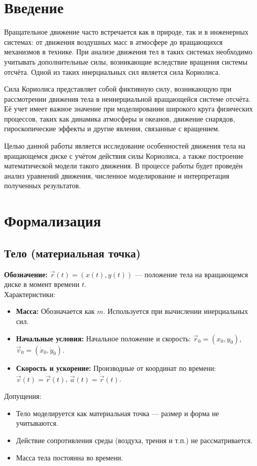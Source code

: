 \documentclass[a4paper,12pt]{article}
\begin{document}
\tableofcontents
\newpage

\section{Введение} 
Вращательное движение часто встречается как в природе, так и в инженерных системах: от движения воздушных масс в атмосфере до вращающихся механизмов в технике. При анализе движения тел в таких системах необходимо учитывать дополнительные силы, возникающие вследствие вращения системы отсчёта. Одной из таких инерциальных сил является сила Кориолиса.

Сила Кориолиса представляет собой фиктивную силу, возникающую при рассмотрении движения тела в неинерциальной вращающейся системе отсчёта. Её учет имеет важное значение при моделировании широкого круга физических процессов, таких как динамика атмосферы и океанов, движение снарядов, гироскопические эффекты и другие явления, связанные с вращением.

Целью данной работы является исследование особенностей движения тела на вращающемся диске с учётом действия силы Кориолиса, а также построение математической модели такого движения. В процессе работы будет проведён анализ уравнений движения, численное моделирование и интерпретация полученных результатов.

\newpage

\section{Формализация}

\subsection{Тело (материальная точка)}

\textbf{Обозначение:} $\vec{r}(t) = (x(t), y(t))$ — положение тела на вращающемся диске в момент времени $t$. \\
Характеристики:
\begin{itemize}
    \item \textbf{Масса:} Обозначается как $m$. Используется при вычислении инерциальных сил.
    \item \textbf{Начальные условия:} Начальное положение и скорость: $\vec{r}_0 = (x_0, y_0)$, $\vec{v}_0 = (\dot{x}_0, \dot{y}_0)$.
    \item \textbf{Скорость и ускорение:} Производные от координат по времени: $\vec{v}(t) = \dot{\vec{r}}(t)$, $\vec{a}(t) = \ddot{\vec{r}}(t)$.
\end{itemize}
Допущения:
\begin{itemize}
    \item Тело моделируется как материальная точка — размер и форма не учитываются.
    \item Действие сопротивления среды (воздуха, трения и т.п.) не рассматривается.
    \item Масса тела постоянна во времени.
\end{itemize}
\end{document}
